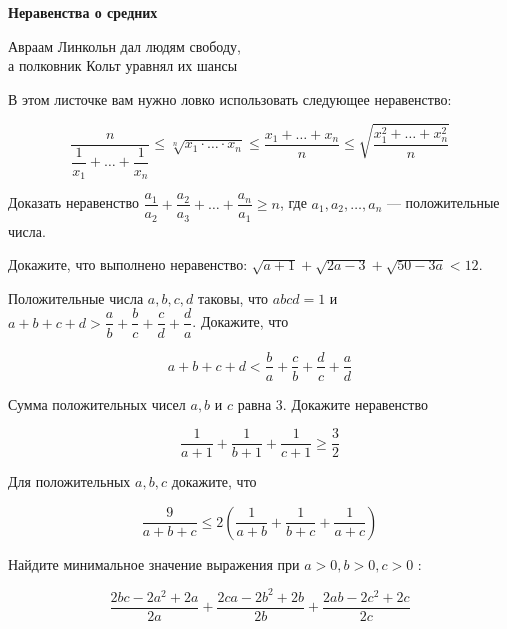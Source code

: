 \centerline{\bf \Huge Неравенства о средних}

\begin{flushright}
        \scriptsize{Авраам Линкольн дал людям свободу,\\ 
                    а полковник Кольт уравнял их шансы}
\end{flushright}

В этом листочке вам нужно ловко использовать следующее неравенство:

$$\dfrac{n}{\dfrac{1}{x_1}+\ldots+\dfrac{1}{x_n}} \leq \sqrt[n]{x_1 \cdot \ldots \cdot x_n} \leq \dfrac{x_1+\ldots+x_n}{n} \leq \sqrt{\dfrac{x_1^2+\ldots+x_n^2}{n}}$$

Доказать неравенство $\dfrac{a_1}{a_2} + \dfrac{a_2}{a_3} + \ldots + \dfrac{a_n}{a_1} \geq n$, где $a_1, a_2, \ldots, a_n$ --- положительные числа.

Докажите, что выполнено неравенство: $ \sqrt{a+1} + \sqrt{2a - 3} + \sqrt{50- 3a} < 12.$


Положительные числа $a, b, c, d$ таковы, что $a b c d=1$ и $a+b+c+d>\dfrac{a}{b}+\dfrac{b}{c}+\dfrac{c}{d}+\dfrac{d}{a}$. Докажите, что

$$
a+b+c+d<\dfrac{b}{a}+\dfrac{c}{b}+\dfrac{d}{c}+\dfrac{a}{d}
$$

Сумма положительных чисел $a, b$ и $c$ равна 3. Докажите неравенство

$$
\dfrac{1}{a+1}+\dfrac{1}{b+1}+\dfrac{1}{c+1} \geqslant \dfrac{3}{2}
$$

Для положительных $a, b, c$ докажите, что

$$
\dfrac{9}{a+b+c} \leqslant 2\left(\dfrac{1}{a+b}+\dfrac{1}{b+c}+\dfrac{1}{a+c}\right)
$$

Найдите минимальное значение выражения при $a>0, b>0, c>0$ :

$$
\dfrac{2 b c-2 a^2+2 a}{2 a}+\dfrac{2 c a-2 b^2+2 b}{2 b}+\dfrac{2 a b-2 c^2+2 c}{2 c}
$$